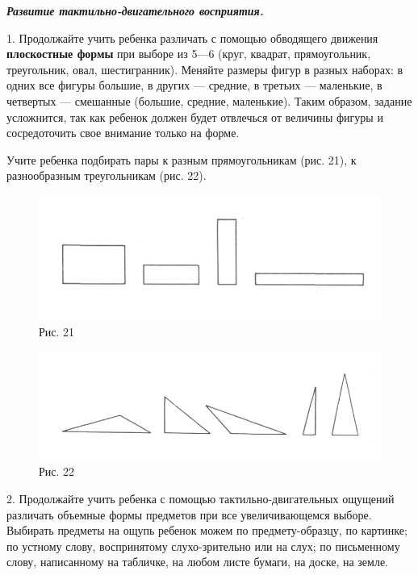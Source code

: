 \documentclass{book}
\renewcommand{\emph}[1]{\textit{#1}}
\begin{document}
\emph{\textbf{Развитие тактильно-двигательного восприятия.}}

1. Продолжайте учить ребенка различать с помощью обводящего движения
\textbf{плоскостные формы} при выборе из 5---6 (круг, квадрат,
прямоугольник, треугольник, овал, шестигранник). Меняйте размеры фигур в
разных наборах: в одних все фигуры большие, в других --- средние, в
третьих --- маленькие, в четвертых --- смешанные (большие, средние,
маленькие). Таким образом, задание усложнится, так как ребенок должен
будет отвлечься от величины фигуры и сосредоточить свое внимание только
на форме.

Учите ребенка подбирать пары к разным прямоугольникам (рис. 21), к
разнообразным треугольникам (рис. 22).

\begin{figure}
\centering
\includegraphics[width=\linewidth]{media/media/image18.png}
\caption*{Рис. 21}
\end{figure}


\begin{figure}
\centering
\includegraphics[width=\linewidth]{media/media/image19.png}
\caption*{Рис. 22}
\end{figure}


2. Продолжайте учить ребенка с помощью тактильно-двигательных ощущений
различать объемные формы предметов при все увеличивающемся выборе.
Выбирать предметы на ощупь ребенок можем по предмету-образцу, по
картинке; по устному слову, воспринятому слухо-зрительно или на слух; по
письменному слову, написанному на табличке, на любом листе бумаги, на
доске, на земле.
\end{document}
